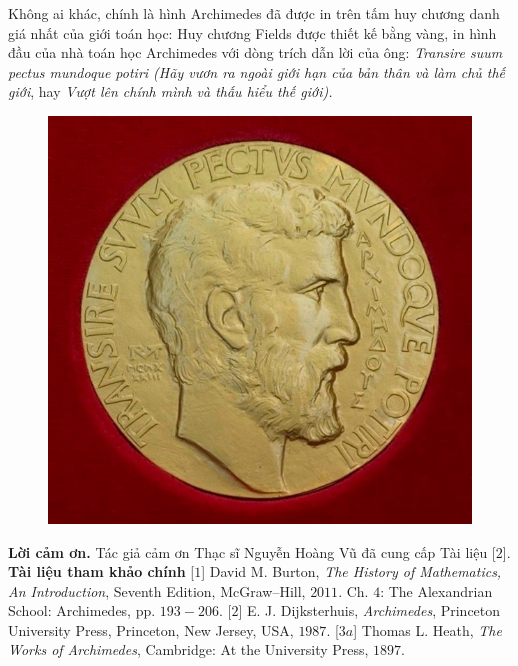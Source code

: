 \begin{multicols}{2}
	\vskip 0.1cm
	Không ai khác, chính là hình Archimedes đã được in trên tấm huy chương danh giá nhất của giới toán học:
	\vskip 0.1cm
	Huy chương Fields được thiết kế bằng vàng, in hình đầu của nhà toán học Archimedes với dòng trích dẫn lời của ông: \textit{Transire suum pectus mundoque potiri (Hãy vươn ra ngoài giới hạn của bản thân và làm chủ thế giới}, hay \textit{Vượt lên chính mình và thấu hiểu thế giới).}
		\begin{figure}[H]
		\vspace*{5pt}
		\centering
		\captionsetup{labelformat= empty, justification=centering}
		\includegraphics[width= 1\linewidth]{10}
		\vspace*{-10pt}
	\end{figure}
	\textbf{\color{lichsutoanhoc}Lời cảm ơn.} Tác giả cảm ơn Thạc sĩ Nguyễn Hoàng Vũ đã cung cấp Tài liệu [$2$].
	\vskip 0.1cm
	\textbf{\color{lichsutoanhoc}Tài liệu tham khảo chính}
	\vskip 0.1cm
	[$1$] David M. Burton, \textit{The History of Mathematics, An Introduction}, Seventh Edition, McGraw--Hill, $2011$. Ch. $4$: The Alexandrian School: Archimedes, pp. $193-206$.
	\vskip 0.1cm
	[$2$] E. J. Dijksterhuis, \textit{Archimedes}, Princeton University Press, Princeton, New Jersey, USA, $1987$. 
	\vskip 0.1cm
	[$3a$] Thomas L. Heath, \textit{The Works of Archimedes}, Cambridge: At the University Press, $1897$.
	\vskip 0.1cm

\end{multicols}
